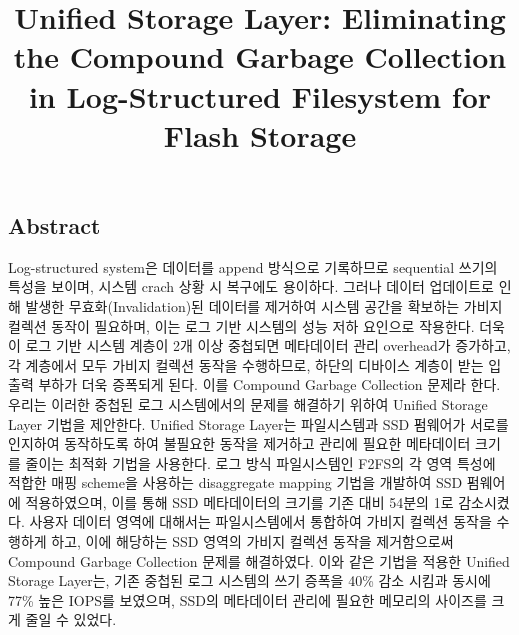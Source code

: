 \documentclass[letterpaper,twocolumn,10pt]{article}
\begin{document}
\date{}

\title{\Large \bf Unified Storage Layer: Eliminating the Compound
Garbage Collection in Log-Structured Filesystem for Flash Storage}


\maketitle

\thispagestyle{empty}


\subsection*{Abstract}
Log-structured system은 데이터를 append 방식으로 기록하므로 sequential 쓰기의 특성을 보이며, 시스템 crach 상황 시 복구에도 용이하다. 그러나 데이터 업데이트로 인해 발생한 무효화(Invalidation)된 데이터를 제거하여 시스템 공간을 확보하는 가비지 컬렉션 동작이 필요하며, 이는 로그 기반 시스템의 성능 저하 요인으로 작용한다. 더욱이 로그 기반 시스템 계층이 2개 이상 중첩되면 메타데이터 관리 overhead가 증가하고, 각 계층에서 모두 가비지 컬렉션 동작을 수행하므로, 하단의 디바이스 계층이 받는 입출력 부하가 더욱 증폭되게 된다. 이를 Compound Garbage Collection 문제라 한다. 우리는 이러한 중첩된 로그 시스템에서의 문제를 해결하기 위하여 Unified Storage Layer 기법을 제안한다. Unified Storage Layer는 파일시스템과 SSD 펌웨어가 서로를 인지하여 동작하도록 하여 불필요한 동작을 제거하고 관리에 필요한 메타데이터 크기를 줄이는 최적화 기법을 사용한다. 로그 방식 파일시스템인 F2FS의 각 영역 특성에 적합한 매핑 scheme을 사용하는 disaggregate mapping 기법을 개발하여 SSD 펌웨어에 적용하였으며, 이를 통해 SSD 메타데이터의 크기를 기존 대비 54분의 1로 감소시켰다. 사용자 데이터 영역에 대해서는 파일시스템에서 통합하여 가비지 컬렉션 동작을 수행하게 하고, 이에 해당하는 SSD 영역의 가비지 컬렉션 동작을 제거함으로써 Compound Garbage Collection 문제를 해결하였다. 이와 같은 기법을 적용한 Unified Storage Layer는, 기존 중첩된 로그 시스템의 쓰기 증폭을 40\% 감소 시킴과 동시에 77\% 높은 IOPS를 보였으며, SSD의 메타데이터 관리에 필요한 메모리의 사이즈를 크게 줄일 수 있었다.
\end{document}
